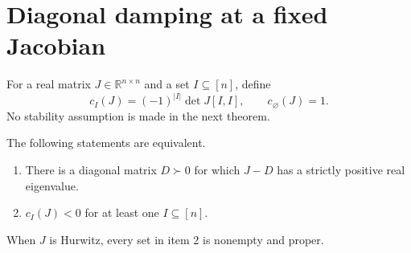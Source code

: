 \section{Diagonal damping at a fixed Jacobian}
\label{sec:fixedJ-independent}

For a real matrix $J\in\mathbb R^{n\times n}$ and a set
$I\subseteq[n]$, define
\[
  c_I(J)=(-1)^{|I|}\det J[I,I],\qquad c_\varnothing(J)=1.
\]
No stability assumption is made in the next theorem.

\begin{theorem}
\label{thm:fixedJ-independent}
The following statements are equivalent.
\begin{enumerate}
\item There is a diagonal matrix $D\succ0$ for which $J-D$ has a
strictly positive real eigenvalue.
\item $c_I(J)<0$ for at least one $I\subseteq[n]$.
\end{enumerate}
When $J$ is Hurwitz, every set in item 2 is nonempty and proper.
\end{theorem}

